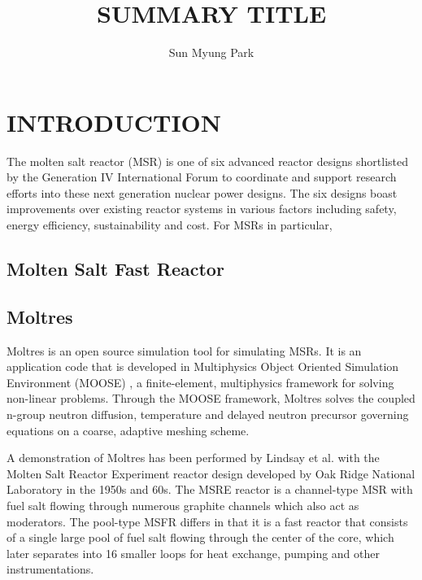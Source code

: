 \documentclass[letterpaper]{mandc2019}
\begin{document}
\title{SUMMARY TITLE}
\author{Sun Myung Park}

\maketitle
\justify

\section{INTRODUCTION}

The molten salt reactor (MSR) is one of six advanced reactor designs shortlisted by the Generation IV International Forum to coordinate and support research efforts into these next generation nuclear power designs. The six designs boast improvements over existing reactor systems in various factors including safety, energy efficiency, sustainability and cost. For MSRs in particular, 

\subsection{Molten Salt Fast Reactor}



\subsection{Moltres}

Moltres is an open source simulation tool for simulating MSRs. It is an application code that is developed in Multiphysics Object Oriented Simulation Environment (MOOSE) \cite{gaston_moose:_2009}, a finite-element, multiphysics framework for solving non-linear problems. Through the MOOSE framework, Moltres solves the coupled n-group neutron diffusion, temperature and delayed neutron precursor governing equations on a coarse, adaptive meshing scheme.



A demonstration of Moltres has been performed by Lindsay et al. \cite{lindsay_introduction_2018} with the Molten Salt Reactor Experiment reactor design developed by Oak Ridge National Laboratory in the 1950s and 60s. The MSRE reactor is a channel-type MSR with fuel salt flowing through numerous graphite channels which also act as moderators. The pool-type MSFR differs in that it is a fast reactor that consists of a single large pool of fuel salt flowing through the center of the core, which later separates into 16 smaller loops for heat exchange, pumping and other instrumentations. 
\end{document}
